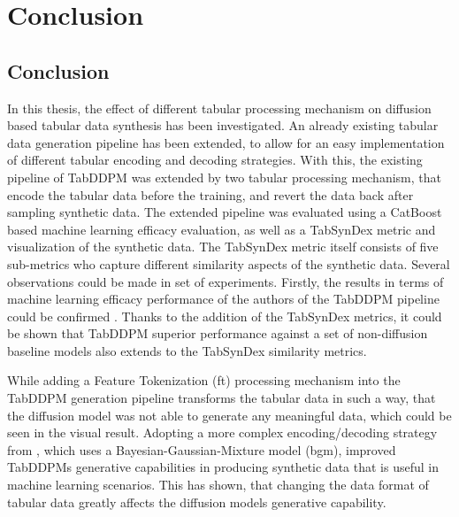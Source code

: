 \chapter{Conclusion}
\label{ch:conclusion}

\section*{Conclusion}
\label{ch:conclusion}

In this thesis, the effect of different tabular processing mechanism on diffusion based tabular data synthesis has been investigated.
An already existing tabular data generation pipeline has been extended, to allow for an easy implementation of different tabular encoding and decoding strategies.
With this, the existing pipeline of TabDDPM \cite{kotelnikov2022TabDDPMModellingTabular} was extended by two tabular processing mechanism, that encode the tabular data before the training, and revert the data back after sampling synthetic data.
The extended pipeline was evaluated using a CatBoost based machine learning efficacy evaluation, as well as a TabSynDex metric and visualization of the synthetic data.
The TabSynDex metric itself consists of five sub-metrics who capture different similarity aspects of the synthetic data.
Several observations could be made in set of experiments.
Firstly, the results in terms of machine learning efficacy performance of the authors of the TabDDPM pipeline could be confirmed \cite{kotelnikov2022TabDDPMModellingTabular}.
Thanks to the addition of the TabSynDex metrics, it could be shown that TabDDPM superior performance against a set of non-diffusion baseline models also extends
to the TabSynDex similarity metrics.

While adding a Feature Tokenization (\gls{ft}) processing mechanism into the TabDDPM generation pipeline transforms the tabular data in such a way,
that the diffusion model was not able to generate any meaningful data, which could be seen in the visual result.
Adopting a more complex encoding/decoding strategy from \cite{zhao2022CTABGANEnhancingTabular}, which uses a Bayesian-Gaussian-Mixture model (\gls{bgm}),
improved TabDDPMs generative capabilities in producing synthetic data that is useful in machine learning scenarios.
This has shown, that changing the data format of tabular data greatly affects the diffusion models generative capability.


